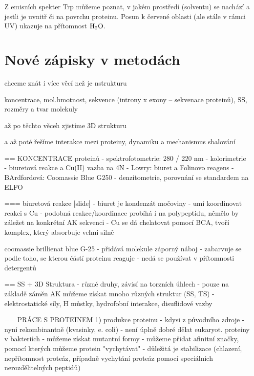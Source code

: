 \documentclass[DIV=8]{scrreprt}
\begin{document}
Z emisních spekter Trp můžeme poznat, v jakém prostředí (solventu) se nachází a jestli je uvnitř či na povrchu proteinu. Posun k červené oblasti (ale stále v rámci UV) ukazuje na přítomnost \(\ce{H2O}\).

\chapter{Nové zápisky v metodách} \label{Nové zápisky v metodách}


\begin{myItemize}[nosep]
    \item chceme znát i více věcí než je nstrukturu
    \item koncentrace, mol.hmotnost, sekvence (introny x exony -- sekvenace proteinů), SS, rozměry a tvar molekuly
    \item až po těchto věceh zjistíme 3D strukturu
    \item a až poté řešíme interakce mezi proteiny, dynamiku a mechanismus sbalování
\end{myItemize}




== KONCENTRACE proteinů
- spektrofotometrie: 280 / 220 nm
- kolorimetrie
    - biuretová reakce a Cu(II) vazba na 4N
    - Lowry: biuret a Folinovo reagens
    - BArdfordová: Coomassie Blue G250
- denzitometrie, porovnání se standardem na ELFO

=== biuretová reakce [slide]
- biuret je kondenzát močoviny
- umí koordinovat reakci s Cu
    - podobná reakce/koordinace probíhá i na polypeptidu, němělo by záležet na konkrétní AK sekvenci
- Cu se dá chelatovat pomocí BCA, tvoří komplex, který absorbuje velmi silně

coomassie brillienat blue G-25
- přidává molekule záporný náboj
- zabarvuje se podle toho, se kterou částí proteinu reaguje
    - nedá se používat v přítomnosti detergentů

== SS + 3D Struktura
- různé druhy, závisí na torzních úhlech
- pouze na základě záměn AK můžeme získat mnoho různých struktur (SS, TS)
- elektrostatické síly, H můstky, hydrofobní interakce, disuflidové vazby

== PRÁCE S PROTEINEM
1) produkce proteinu
- kdysi z původního zdroje
- nyní rekombinantně (kvasinky, e. coli)
    - není úplně dobré dělat eukaryot. proteiny v bakteriích
    - můžeme získat mutantní formy
    - můžeme přidat afinitní značky, pomocí kterých můžeme protein "vychytávat"
- důležitá je stabilizace (chlazení, nepřítomnost proteáz, případně vychytání proteáz pomocí speciálních nerozdělitelných peptidů)
\end{document}
